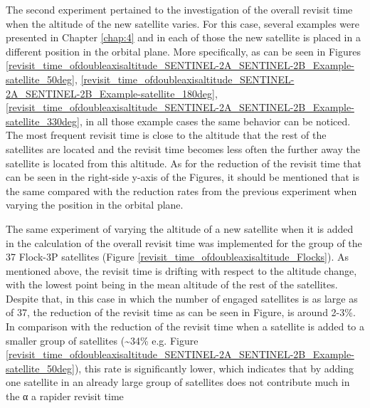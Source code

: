 \bigskip
The second experiment pertained to the investigation of the overall revisit time when the altitude of the new satellite varies. For this case, several examples were presented in Chapter \ref{chap:4} and in each of those the new satellite is placed in a different position in the orbital plane. More specifically, as can be seen in Figures \ref{revisit_time_ofdoubleaxisaltitude_SENTINEL-2A_SENTINEL-2B_Example-satellite_50deg}, \ref{revisit_time_ofdoubleaxisaltitude_SENTINEL-2A_SENTINEL-2B_Example-satellite_180deg}, \ref{revisit_time_ofdoubleaxisaltitude_SENTINEL-2A_SENTINEL-2B_Example-satellite_330deg}, in all those example cases the same behavior can be noticed. The most frequent revisit time is close to the altitude that the rest of the satellites are located and the revisit time becomes less often the further away the satellite is located from this altitude. As for the reduction of the revisit time that can be seen in the right-side y-axis of the Figures, it should be mentioned that is the same compared with the reduction rates from the previous experiment when varying the position in the orbital plane.

The same experiment of varying the altitude of a new satellite when it is added in the calculation of the overall revisit time was implemented for the group of the 37 Flock-3P satellites (Figure \ref{revisit_time_ofdoubleaxisaltitude_Flocks}). As mentioned above, the revisit time is drifting with respect to the altitude change, with the lowest point being in the mean altitude of the rest of the satellites. Despite that, in this case in which the number of engaged satellites is as large as of 37, the reduction of the revisit time as can be seen in Figure, is around 2-3\%. In comparison with the reduction of the revisit time when a satellite is added to a smaller group of satellites (\sim 34\% e.g. Figure \ref{revisit_time_ofdoubleaxisaltitude_SENTINEL-2A_SENTINEL-2B_Example-satellite_50deg}), this rate is significantly lower, which indicates that by adding one satellite in an already large group of satellites does not contribute much in the α a rapider revisit time

\bigskip



